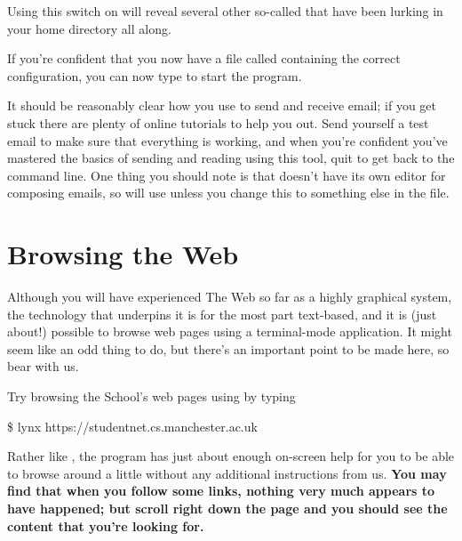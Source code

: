 Using this switch on  will reveal several other so-called  that have been lurking in your home directory all along.

If you're confident that you now have a file called  containing the correct configuration, you can now type  to start the program.

It should be reasonably clear how you use  to send and receive email; if you get stuck there are plenty of online tutorials to help you out. Send yourself a test email to make sure that everything is working, and when you're confident you've mastered the basics of sending and reading using this tool, quit  to get back to the command line. One thing you should note is that  doesn't have its own editor for composing emails, so will use  unless you change this to something else in the  file.

\section{Browsing the Web}

Although you will have experienced The Web so far as a highly graphical system, the technology that underpins it is for the most part text-based, and it is (just about!) possible to browse web pages using a terminal-mode application. It might seem like an odd thing to do, but there's an important point to be made here, so bear with us.



Try browsing the School's web pages using  by typing

\begin{ttoutenv}
\$ lynx https://studentnet.cs.manchester.ac.uk
\end{ttoutenv}

Rather like , the  program has just about enough on-screen help for you to be able to browse around a little without any additional instructions from us.  \textbf{You may find that when you follow some links, nothing very much appears to have happened; but scroll right down the page and you should see the content that you're looking for.}

